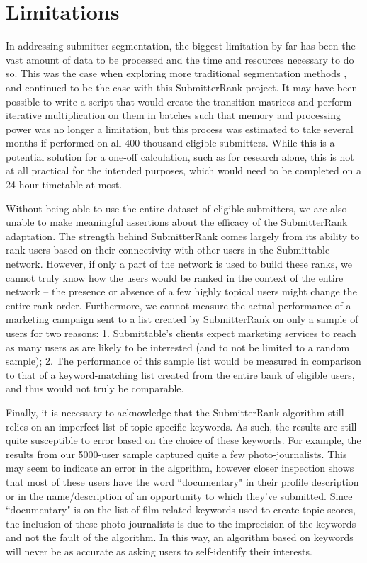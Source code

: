 \documentclass[]{report}   %
\begin{document}
\section{Limitations}

In addressing submitter segmentation, the biggest limitation by far has been the vast amount of data to be processed and the time and resources necessary to do so. This was the case when exploring more traditional segmentation methods \cite{marbut_2018}, and continued to be the case with this SubmitterRank project. It may have been possible to write a script that would create the transition matrices and perform iterative multiplication on them in batches such that memory and processing power was no longer a limitation, but this process was estimated to take several months if performed on all 400 thousand eligible submitters. While this is a potential solution for a one-off calculation, such as for research alone, this is not at all practical for the intended purposes, which would need to be completed on a 24-hour timetable at most.

Without being able to use the entire dataset of eligible submitters, we are also unable to make meaningful assertions about the efficacy of the SubmitterRank adaptation. The strength behind SubmitterRank comes largely from its ability to rank users based on their connectivity with other users in the Submittable network. However, if only a part of the network is used to build these ranks, we cannot truly know how the users would be ranked in the context of the entire network -- the presence or absence of a few highly topical users might change the entire rank order. Furthermore, we cannot measure the actual performance of a marketing campaign sent to a list created by SubmitterRank on only a sample of users for two reasons: 1. Submittable's clients expect marketing services to reach as many users as are likely to be interested (and to not be limited to a random sample); 2. The performance of this sample list would be measured in comparison to that of a keyword-matching list created from the entire bank of eligible users, and thus would not truly be comparable.

Finally, it is necessary to acknowledge that the SubmitterRank algorithm still relies on an imperfect list of topic-specific keywords. As such, the results are still quite susceptible to error based on the choice of these keywords. For example, the results from our 5000-user sample captured quite a few photo-journalists. This may seem to indicate an error in the algorithm, however closer inspection shows that most of these users have the word ``documentary" in their profile description or in the name/description of an opportunity to which they've submitted. Since ``documentary" is on the list of film-related keywords used to create topic scores, the inclusion of these photo-journalists is due to the imprecision of the keywords and not the fault of the algorithm. In this way, an algorithm based on keywords will never be as accurate as asking users to self-identify their interests.
    
\end{document}
